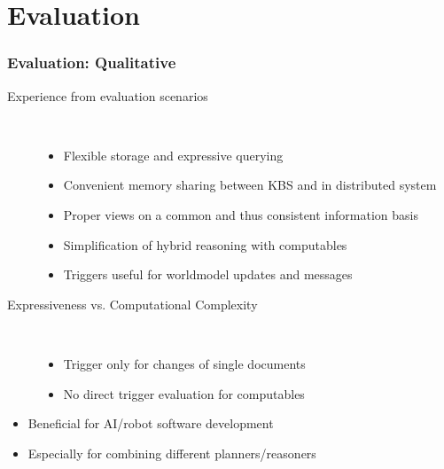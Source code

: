 \section{Evaluation}
\begin{frame}
  \frametitle{Evaluation: Qualitative}
  \begin{description}
  \item[Experience from evaluation scenarios]%
                \hfill \\
    \begin{itemize}
    \item Flexible storage and expressive querying
    \item Convenient memory sharing between KBS and in distributed system
    \item Proper views on a common and thus consistent information basis
    \item Simplification of hybrid reasoning with computables
    \item Triggers useful for worldmodel updates and messages
    \end{itemize}
  \item[Expressiveness vs. Computational Complexity]%
                \hfill \\
    \begin{itemize}
    \item Trigger only for changes of single documents %
    \item No direct trigger evaluation for computables %
    \end{itemize}
  \end{description}

\begin{block}{}%
  \begin{itemize}
  \item Beneficial for AI/robot software development
  \item Especially for combining different planners/reasoners
  \end{itemize}
  \end{block}
\end{frame}

